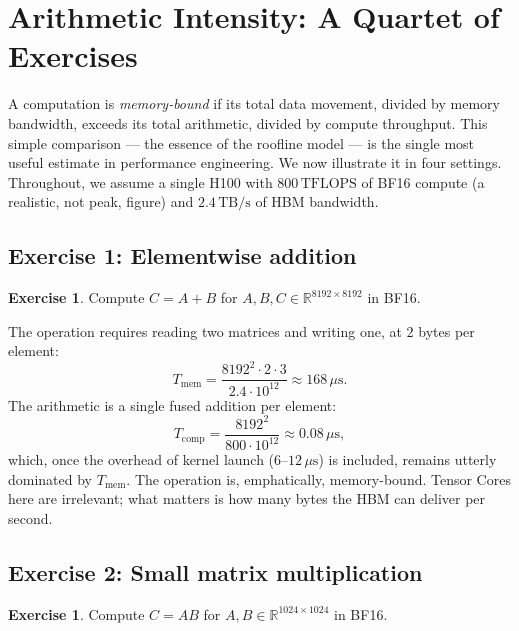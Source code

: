 \documentclass[11pt,a4paper]{article}
\theoremstyle{definition}
\newtheorem{exercise}[definition]{Exercise}
\theoremstyle{remark}
\theoremstyle{plain}
\newcommand{\TB}{\,\text{TB}}
\newcommand{\TFLOPS}{\,\text{TFLOPS}}
\newcommand{\us}{\,\mu\text{s}}
\begin{document}
\section{Arithmetic Intensity: A Quartet of Exercises}
\label{sec:intensity}


A computation is \emph{memory-bound} if its total data movement, divided by memory bandwidth, exceeds its total arithmetic, divided by compute throughput. This simple comparison --- the essence of the roofline model --- is the single most useful estimate in performance engineering. We now illustrate it in four settings. Throughout, we assume a single H100 with $800\TFLOPS$ of BF16 compute (a realistic, not peak, figure) and $2.4\TB/\text{s}$ of HBM bandwidth.

\subsection{Exercise 1: Elementwise addition}

\begin{exercise}
Compute $C = A + B$ for $A,B,C \in \mathbb{R}^{8192 \times 8192}$ in BF16.
\end{exercise}

The operation requires reading two matrices and writing one, at $2$ bytes per element:
\begin{equation}
T_{\text{mem}} = \frac{8192^2 \cdot 2 \cdot 3}{2.4 \cdot 10^{12}} \approx 168\us.
\end{equation}
The arithmetic is a single fused addition per element:
\begin{equation}
T_{\text{comp}} = \frac{8192^2}{800 \cdot 10^{12}} \approx 0.08\us,
\end{equation}
which, once the overhead of kernel launch ($6$--$12\us$) is included, remains utterly dominated by $T_{\text{mem}}$. The operation is, emphatically, memory-bound. Tensor Cores here are irrelevant; what matters is how many bytes the HBM can deliver per second.

\subsection{Exercise 2: Small matrix multiplication}

\begin{exercise}
Compute $C = A B$ for $A,B \in \mathbb{R}^{1024 \times 1024}$ in BF16.
\end{exercise}
\end{document}
